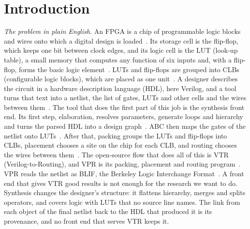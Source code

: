\documentclass[conference]{IEEEtran}
\begin{document}

\section{Introduction}
\label{sec:intro}

\emph{The problem in plain English.}
An FPGA is a chip of programmable logic blocks and wires onto which a digital design is loaded~\cite{jamiesonthesis}. %
Its storage cell is the flip-flop, which keeps one bit between clock edges, %
and its logic cell is the LUT (look-up table), a small memory that computes any function of six inputs and, with a flip-flop, forms the basic logic element~\cite{jamiesonthesis}. %
LUTs and flip-flops are grouped into CLBs (configurable logic blocks), which are placed as one unit~\cite{jamiesonthesis,luuthesis}. %
A designer describes the circuit in a hardware description language (HDL), here Verilog, %
and a tool turns that text into a netlist, the list of gates, LUTs and other cells and the wires between them~\cite{jamiesonthesis}. %
The tool that does the first part of this job is the synthesis front end. %
Its first step, elaboration, resolves parameters, generate loops and hierarchy and turns the parsed HDL into a design graph~\cite{jamiesonthesis}. %
ABC then maps the gates of the netlist onto LUTs~\cite{brayton2010abc}. %
After that, packing groups the LUTs and flip-flops into CLBs, placement chooses a site on the chip for each CLB, and routing chooses the wires between them~\cite{jamiesonthesis}. %
The open-source flow that does all of this is VTR (Verilog-to-Routing), and VPR is its packing, placement and routing program~\cite{rose2012vtr,luuthesis}. %
VPR reads the netlist as BLIF, the Berkeley Logic Interchange Format~\cite{blif}. %
A front end that gives VTR good results is not enough for the research we want to do. %
Synthesis changes the designer's structure: it flattens hierarchy, merges and splits operators, and covers logic with LUTs that no source line names. %
The link from each object of the final netlist back to the HDL that produced it is its provenance, %
and no front end that serves VTR keeps it.
\end{document}
